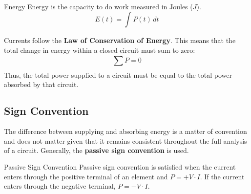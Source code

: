\documentclass[12pt]{article}
\begin{document}
\begin{definition}{Energy}
  Energy is the capacity to do work measured in Joules ($J$).
  \begin{equation*}
    E(t) = \int_{}^{} P(t) \, dt
  \end{equation*}
\end{definition}

Currents follow the \textbf{Law of Conservation of Energy}. This means that the total change in energy within a closed circuit must sum to zero:
\begin{equation*}
  \sum_{}^{} P = 0
\end{equation*}
Thus, the total power supplied to a circuit must be equal to the total power absorbed by that circuit.

\subsection{Sign Convention}
\label{ssec:signConvention}

The difference between supplying and absorbing energy is a matter of convention and does not matter given that it remains consistent throughout the full analysis of a circuit. Generally, the \textbf{passive sign convention} is used.

\begin{definition}{Passive Sign Convention}
  Passive sign convention is satisfied when the current enters through the positive terminal of an element and $P=+V \cdot I$. If the current enters through the negative terminal, $P = -V \cdot I$.
\end{definition}
\end{document}

